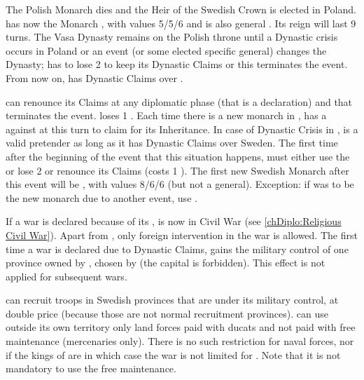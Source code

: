 \phevnt
\aparag The Polish Monarch dies and the Heir of the Swedish Crown is elected
in Poland. \POL has now the Monarch , with values 5/5/6
and is also general . Its reign will last 9 turns.
\aparag The Vasa Dynasty remains on the Polish throne until a Dynastic crisis
occurs in Poland or an event (or some elected specific general) changes the
Dynasty; \POL has to lose 2 \STAB to keep its Dynastic Claims or this
terminates the event.  From now on, \POL has Dynastic Claims over \SUE.

\effetlong
\aparag \POL can renounce its Claims at any diplomatic phase (that is a
declaration) and that terminates the event. \POL loses 1 \STAB.
\aparag Each time there is a new monarch in \SUE, \POL has a \CB against \SUE
at this turn to claim for its Inheritance. In case of Dynastic Crisis in \SUE,
\POL is a valid pretender as long as it has Dynastic Claims over Sweden.
\bparag The first time after the beginning of the event that this situation
happens, \POL must either use the \CB or lose 2 \STAB or renounce its Claims
(costs 1 \STAB).
\aparag The first new Swedish Monarch after this event will be
, with values 8/6/6 (but not a general).  Exception: if
 was to be the new monarch due to another event, use
.

\phdipl
\aparag If a war is declared because of its \CB, \SUE is now in Civil War (see
\ref{chDiplo:Religious Civil War}). Apart from \POL, only foreign intervention
in the war is allowed.
\aparag The first time a war is declared due to Dynastic Claims, \POL gains
the military control of one province owned by \SUE, chosen by \POL (the
capital is forbidden). This effect is not applied for subsequent wars.

\phadm
\aparag \POL can recruit troops in Swedish provinces that are under its
military control, at double price (because those are not normal recruitment
provinces).
\aparag \POL can use outside its own territory only land forces paid with
ducats and not paid with free maintenance (mercenaries only). There is no such
restriction for naval forces, nor if the kings of \SUE are \PROTRIG in which
case the war is not limited for \POL. Note that it is not mandatory to use the
free maintenance.


